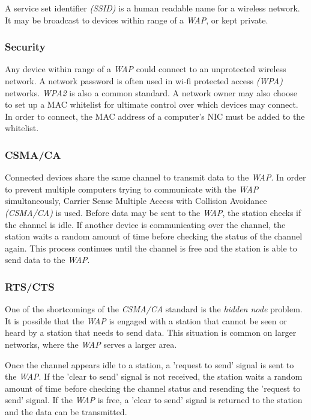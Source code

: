\documentclass[9pt]{article}
\begin{document}
A service set identifier \emph{(SSID)} is a human readable name for a wireless network. It may be broadcast to devices within range of a \emph{WAP}, or kept private.

\subsubsection{Security}
\label{sec:orgee5e140}

Any device within range of a \emph{WAP} could connect to an unprotected wireless network. A network password is often used in wi-fi protected access \emph{(WPA)} networks. \emph{WPA2} is also a common standard. A network owner may also choose to set up a MAC whitelist for ultimate control over which devices may connect. In order to connect, the MAC address of a computer's NIC must be added to the whitelist.

\subsubsection{CSMA/CA}
\label{sec:org051e6cc}

Connected devices share the same channel to transmit data to the \emph{WAP}. In order to prevent multiple computers trying to communicate with the \emph{WAP} simultaneously, Carrier Sense Multiple Access with Collision Avoidance \emph{(CSMA/CA)} is used. Before data may be sent to the \emph{WAP}, the station checks if the channel is idle. If another device is communicating over the channel, the station waits a random amount of time before checking the status of the channel again. This process continues until the channel is free and the station is able to send data to the \emph{WAP}.

\subsubsection{RTS/CTS}
\label{sec:org28caca5}

One of the shortcomings of the \emph{CSMA/CA} standard is the \emph{hidden node} problem. It is possible that the \emph{WAP} is engaged with a station that cannot be seen or heard by a station that needs to send data. This situation is common on larger networks, where the \emph{WAP} serves a larger area.

Once the channel appears idle to a station, a 'request to send' signal is sent to the \emph{WAP}. If the 'clear to send' signal is not received, the station waits a random amount of time before checking the channel status and resending the 'request to send' signal. If the \emph{WAP} is free, a 'clear to send' signal is returned to the station and the data can be transmitted.
\end{document}

